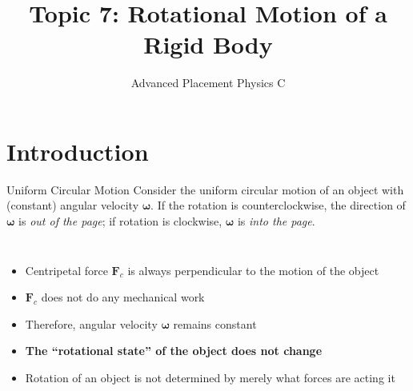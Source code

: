 \documentclass[12pt,compress,aspectratio=169]{beamer}
\title{Topic 7: Rotational Motion of a Rigid Body}
\subtitle{Advanced Placement Physics C}
\begin{document}
\begin{frame}
  \maketitle
\end{frame}


\section{Introduction}

\begin{frame}{Uniform Circular Motion}
  Consider the uniform circular motion of an object with (constant)
  angular velocity $\bm\omega$. If the rotation is
    counterclockwise, the direction of $\bm\omega$ is \emph{out of the page};
    if rotation is clockwise, $\bm\omega$ is \emph{into the page}.
  \begin{columns}
    \centering

    \begin{itemize}
    \item Centripetal force $\bm{F}_c$ is always perpendicular to the
      motion of the object
    \item $\bm{F}_c$ does not do any mechanical work
    \item Therefore, angular velocity $\bm\omega$ remains constant
    \item\textbf{The ``rotational state'' of the object does not change}
    \item Rotation of an object is not determined by merely what forces are
      acting it
    \end{itemize}
  \end{columns}
\end{frame}
\end{document}
